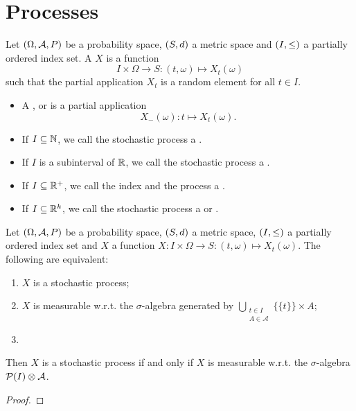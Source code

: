\section{Processes}
\begin{definition}
Let $\sSet{\Omega, \mathcal{A}, P}$ be a probability space, $\sSet{S,d}$ a metric space and $\sSet{I,\leq}$ a partially ordered index set. A  $X$ is a function
\[ I\times \Omega \to S: (t,\omega) \mapsto X_t(\omega) \]
such that the partial application $X_t$ is a random element for all $t\in I$.
\begin{itemize}
\item A ,  or  is a partial application
\[ X_-(\omega): t\mapsto X_t(\omega). \]
\item If $I \subseteq \mathbb{N}$, we call the stochastic process a .
\item If $I$ is a subinterval of $\mathbb{R}$, we call the stochastic process a .
\item If $I\subseteq \mathbb{R}^+$, we call the index  and the process a .
\item If $I\subseteq \mathbb{R}^k$, we call the stochastic process a  or .
\end{itemize}
\end{definition}

\begin{lemma}
Let $\sSet{\Omega, \mathcal{A}, P}$ be a probability space, $\sSet{S,d}$ a metric space, $\sSet{I,\leq}$ a partially ordered index set and $X$ a function $X: I\times \Omega\to S: (t,\omega) \mapsto X_t(\omega)$. The following are equivalent:
\begin{enumerate}
\item $X$ is a stochastic process;
\item $X$ is measurable w.r.t. the $\sigma$-algebra generated by $\bigcup_{\substack{t\in I\\ A\in \mathcal{A}}}\{\{t\}\}\times A$;
\item 
\end{enumerate}

Then $X$ is a stochastic process \textup{if and only if} $X$ is measurable w.r.t. the $\sigma$-algebra $\operatorname{\mathcal{P}}(I)\otimes \mathcal{A}$.
\end{lemma}
\begin{proof}

\end{proof}


